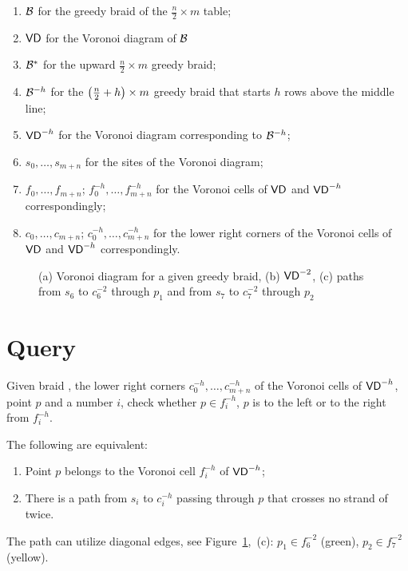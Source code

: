 \documentclass[a4paper,11pt]{article}
\begin{document}
\begin{enumerate}
	\item \(\braid\) for the greedy braid of the \(\frac{n}{2} \times m\) table;
	\item \(\VD\) for the Voronoi diagram of \(\braid\) %
	\item \(\braid^*\) for the upward \(\frac{n}{2} \times m\) greedy braid;
	\item \(\braid^{-h}\) for the \(\lr*{\frac{n}{2} + h} \times m\) greedy braid that starts \(h\) rows above the middle line;
	\item \(\VD^{-h}\) for the Voronoi diagram corresponding to \(\braid^{-h}\);
	\item \(s_0, \ldots, s_{m+n}\) for the sites of the Voronoi diagram;
	\item \(f_0, \ldots, f_{m+n}\); \(f_0^{-h}, \ldots, f_{m+n}^{-h}\) for the Voronoi cells of \(\VD\) and \(\VD^{-h}\) correspondingly;
	\item \(c_0, \ldots, c_{m+n}\); \(c_0^{-h}, \ldots, c_{m+n}^{-h}\) for the lower right corners of the Voronoi cells of \(\VD\) and \(\VD^{-h}\) correspondingly.
\end{enumerate}


\begin{figure}[ht] \centering
	

	

	\caption{(a) Voronoi diagram for a given greedy braid, (b) \(\VD^{-2}\), (c) paths from \(s_6\) to \(c_6^{-2}\) through \(p_1\) and from \(s_7\) to \(c_7^{-2}\) through \(p_2\)}
	\label{fig:vd-ex}
\end{figure}


\section{Query}

\begin{problem}
	Given braid \braid, the lower right corners \(c_0^{-h}, \ldots, c_{m+n}^{-h}\) of the Voronoi cells of \(\VD^{-h}\), point \(p\) and a number \(i\), check whether \(p \in f_i^{-h}\), \(p\) is to the left or to the right from \(f_i^{-h}\).
\end{problem}

\begin{lemma}
	The following are equivalent:
   \begin{enumerate}
	\item Point \(p\) belongs to the Voronoi cell \(f_i^{-h}\) of \(\VD^{-h}\);
	\item There is a path from \(s_i\) to \(c_i^{-h}\) passing through \(p\) that crosses no strand of \braid twice.
   \end{enumerate}
\end{lemma}

The path can utilize diagonal edges, see Figure~\ref{fig:vd-ex},~(c): \(p_1 \in f_6^{-2}\) (green), \(p_2 \in f_7^{-2}\) (yellow).


%
\end{document}
